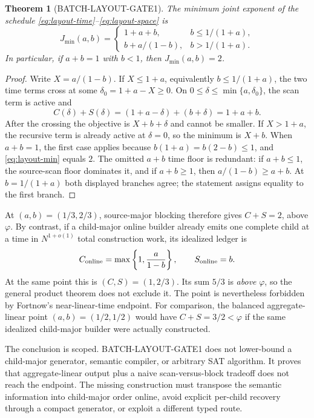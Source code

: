 \documentclass[11pt]{article}
\newtheorem{theorem}{Theorem}[section]
\begin{document}
\begin{theorem}[BATCH-LAYOUT-GATE1]
The minimum joint exponent of the schedule
\eqref{eq:layout-time}--\eqref{eq:layout-space} is
\begin{equation}
 J_{\min}(a,b)=
 \begin{cases}
 1+a+b,& b\le 1/(1+a),\\[2pt]
 b+a/(1-b),& b>1/(1+a).
 \end{cases}
 \label{eq:layout-min}
\end{equation}
In particular, if $a+b=1$ with $b<1$, then $J_{\min}(a,b)=2$.
\end{theorem}

\begin{proof}
Write $X=a/(1-b)$.  If $X\le1+a$, equivalently
$b\le1/(1+a)$, the two time terms cross at some
$\delta_0=1+a-X\ge0$.  On $0\le\delta\le\min\{a,\delta_0\}$,
the scan term is active and
\[
 C(\delta)+S(\delta)
 =(1+a-\delta)+(b+\delta)=1+a+b.
\]
After the crossing the objective is $X+b+\delta$ and cannot be smaller.
If $X>1+a$, the recursive term is already active at $\delta=0$, so the
minimum is $X+b$.  When $a+b=1$, the first case applies because
$b(1+a)=b(2-b)\le1$, and \eqref{eq:layout-min} equals $2$.
The omitted $a+b$ time floor is redundant: if $a+b\le1$, the source-scan
floor dominates it, and if $a+b\ge1$, then $a/(1-b)\ge a+b$.  At
$b=1/(1+a)$ both displayed branches agree; the statement assigns equality to
the first branch.
\end{proof}

At $(a,b)=(1/3,2/3)$, source-major blocking therefore gives $C+S=2$,
above $\varphi$.  By contrast, if a child-major online builder already emits
one complete child at a time in $N^{1+o(1)}$ total construction work, its
idealized ledger is
\begin{equation}
 C_{\rm online}=\max\left\{1,\frac{a}{1-b}\right\},
 \qquad S_{\rm online}=b.
\end{equation}
At the same point this is $(C,S)=(1,2/3)$.  Its sum $5/3$ is
\emph{above} $\varphi$, so the general product theorem does not exclude it.
The point is nevertheless forbidden by Fortnow's near-linear-time endpoint.
For comparison, the balanced aggregate-linear point $(a,b)=(1/2,1/2)$
would have $C+S=3/2<\varphi$ if the same idealized child-major builder were
actually constructed.

The conclusion is scoped.  BATCH-LAYOUT-GATE1 does not lower-bound a
child-major generator, semantic compiler, or arbitrary SAT algorithm.  It
proves that aggregate-linear output plus a naive scan-versus-block tradeoff
does not reach the endpoint.  The missing construction must transpose the
semantic information into child-major order online, avoid explicit per-child
recovery through a compact generator, or exploit a different typed route.
\end{document}
